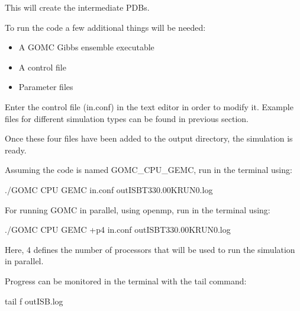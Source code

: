 \documentclass[letterpaper,10pt,english]{sphinxmanual}
\begin{document}
\sphinxAtStartPar
This will create the intermediate PDBs.

\sphinxAtStartPar
To run the code a few additional things will be needed:
\begin{itemize}
\item {} 
\sphinxAtStartPar
A GOMC Gibbs ensemble executable

\item {} 
\sphinxAtStartPar
A control file

\item {} 
\sphinxAtStartPar
Parameter files

\end{itemize}

\sphinxAtStartPar
Enter the control file (in.conf) in the text editor in order to modify it. Example files for different simulation types can be found in previous section.

\sphinxAtStartPar
Once these four files have been added to the output directory, the simulation is ready.

\sphinxAtStartPar
Assuming the code is named GOMC\_CPU\_GEMC, run in the terminal using:

\begin{sphinxVerbatim}[commandchars=\\\{\}]
\PYGZdl{} ./GOMC CPU GEMC in.conf \PYGZgt{} out\PYGZus{}ISB\PYGZus{}T\PYGZus{}330.00\PYGZus{}K\PYGZus{}RUN\PYGZus{}0.log 
\end{sphinxVerbatim}

\sphinxAtStartPar
For running GOMC in parallel, using openmp, run in the terminal using:

\begin{sphinxVerbatim}[commandchars=\\\{\}]
\PYGZdl{} ./GOMC CPU GEMC +p4 in.conf \PYGZgt{} out\PYGZus{}ISB\PYGZus{}T\PYGZus{}330.00\PYGZus{}K\PYGZus{}RUN\PYGZus{}0.log
\end{sphinxVerbatim}

\sphinxAtStartPar
Here, 4 defines the number of processors that will be used to run the simulation in parallel.

\sphinxAtStartPar
Progress can be monitored in the terminal with the tail command:

\begin{sphinxVerbatim}[commandchars=\\\{\}]
\PYGZdl{} tail \PYGZhy{}f out\PYGZus{}ISB.log
\end{sphinxVerbatim}
\end{document}
